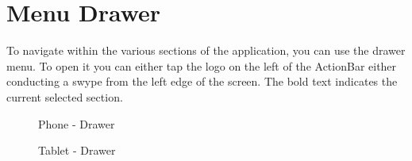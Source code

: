 


\chapter{Menu Drawer}
To navigate within the various sections of the application, you can use the drawer menu. To open it you can either tap the logo on the left of the ActionBar either conducting a swype from the left edge of the screen. 
The bold text indicates the current selected section.

	\begin{figure}[h!]
		  \centering
		  \caption{Phone - Drawer}
	\end{figure}

	\begin{figure}[h!]
		  \centering
		  \caption{Tablet - Drawer}
	\end{figure}